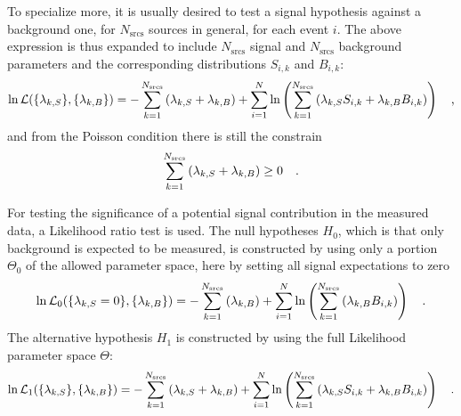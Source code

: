 To specialize more, it is usually desired to test a signal hypothesis against a background one, for $N_\text{srcs}$ sources in general, for each event $i$.
The above expression is thus expanded to include $N_\text{srcs}$ signal and $N_\text{srcs}$ background parameters and the corresponding distributions $S_{i,k}$ and $B_{i,k}$:
\begin{equation}
  \ln\mathcal{L}(\{\lambda_{k,S}\}, \{\lambda_{k,B}\})
  = -\sum_{k=1}^{N_\text{srcs}}\left(\lambda_{k,S}+\lambda_{k,B}\right) +
    \sum_{i=1}^N \ln\left(\sum_{k=1}^{N_\text{srcs}}\left(
      \lambda_{k,S} S_{i,k}+\lambda_{k,B} B_{i,k}\right)\right)
  \quad\text{,}
\end{equation}
and from the Poisson condition there is still the constrain
\begin{equation}
  \sum_{k=1}^{N_\text{srcs}}\left(\lambda_{k,S}+\lambda_{k,B}\right) \geq 0
  \quad\text{.}
\end{equation}

For testing the significance of a potential signal contribution in the measured data, a Likelihood ratio test is used.
The null hypotheses $H_0$, which is that only background is expected to be measured, is constructed by using only a portion $\Theta_0$ of the allowed parameter space, here by setting all signal expectations to zero
\begin{equation}
  \ln\mathcal{L}_0(\{\lambda_{k,S}=0\}, \{\lambda_{k,B}\})
  = -\sum_{k=1}^{N_\text{srcs}}\left(\lambda_{k,B}\right) +
    \sum_{i=1}^N \ln\left(\sum_{k=1}^{N_\text{srcs}}\left(
      \lambda_{k,B} B_{i,k}\right)\right)
  \quad\text{.}
\end{equation}
The alternative hypothesis $H_1$ is constructed by using the full Likelihood parameter space $\Theta$:
\begin{equation}
  \ln\mathcal{L}_1(\{\lambda_{k,S}\}, \{\lambda_{k,B}\})
  = -\sum_{k=1}^{N_\text{srcs}}\left(\lambda_{k,S}+
                                     \lambda_{k,B}\right) +
    \sum_{i=1}^N \ln\left(\sum_{k=1}^{N_\text{srcs}}\left(
      \lambda_{k,S} S_{i,k}+\lambda_{k,B} B_{i,k}\right)\right)
  \quad\text{.}
\end{equation}

